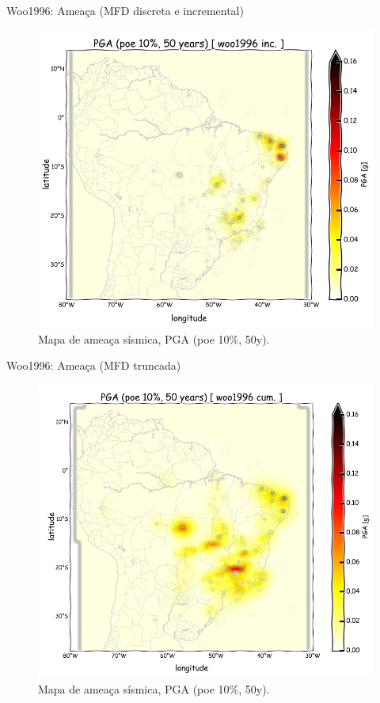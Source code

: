 \documentclass[ucs,8pt]{beamer}
\begin{document}
\begin{frame}{Woo1996: Ameaça (MFD discreta e incremental)}
\begin{figure}[H]
  \centering
  \includegraphics[height=.95\textheight]{pga_woo_inc} 
  \caption{Mapa de ameaça sísmica, PGA (poe 10\%, 50y).}
  \label{fig:pga_woo_inc} 
\end{figure}
\end{frame}



\begin{frame}{Woo1996: Ameaça (MFD truncada)}
\begin{figure}[H]
	\centering
	\includegraphics[height=0.95\textheight]{pga_woo_cum} 
	\caption{Mapa de ameaça sísmica, PGA (poe 10\%, 50y).}
	\label{fig:pga_woo_cum} 
\end{figure}
\end{frame}
\end{document}
